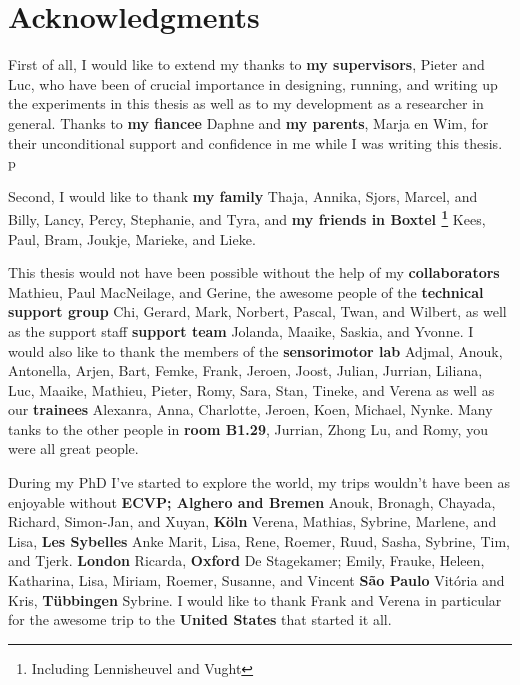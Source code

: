 \clearpage
\pagestyle{empty}

\chapter*{Acknowledgments}
{}

First of all, I would like to extend my thanks to \textbf{my supervisors}, Pieter and Luc, who have been of crucial importance in designing, running, and writing up the experiments in this thesis as well as to my development as a researcher in general. Thanks to \textbf{my fiancee} Daphne and \textbf{my parents}, Marja en Wim, for their unconditional support and confidence in me while I was writing this thesis. p

Second, I would like to thank \textbf{my family} Thaja, Annika, Sjors, Marcel, and Billy, Lancy, Percy, Stephanie, and Tyra, and \textbf{my friends in Boxtel \footnote{Including Lennisheuvel and Vught}} Kees, Paul, Bram, Joukje, Marieke, and Lieke.


This thesis would not have been possible without the help of 
my \textbf{collaborators} Mathieu, Paul MacNeilage, and Gerine,
the awesome people of the
\textbf{technical support group} Chi, Gerard, Mark, Norbert, Pascal, Twan, and Wilbert,
as well as the support staff
\textbf{support team} Jolanda, Maaike, Saskia, and Yvonne.
I would also like to thank the members of the 
\textbf{sensorimotor lab} Adjmal, Anouk, Antonella, Arjen, Bart, Femke, Frank, Jeroen, Joost, Julian, Jurrian, Liliana, Luc, Maaike, Mathieu, Pieter, Romy, Sara, Stan, Tineke, and Verena 
as well as our 
\textbf{trainees} Alexanra, Anna, Charlotte, Jeroen, Koen, Michael, Nynke.
Many tanks to the other people in \textbf{room B1.29}, Jurrian, Zhong Lu, and Romy, you were all great people.


During my PhD I've started to explore the world, my trips wouldn't have been as enjoyable without 
\textbf{ECVP; Alghero and Bremen} Anouk, Bronagh, Chayada, Richard, Simon-Jan, and Xuyan,
\textbf{K\"oln} Verena, Mathias, Sybrine, Marlene, and Lisa,
\textbf{Les Sybelles} Anke Marit, Lisa, Rene, Roemer, Ruud, Sasha, Sybrine, Tim, and Tjerk.
\textbf{London} Ricarda,
\textbf{Oxford} De Stagekamer; Emily, Frauke, Heleen, Katharina, Lisa, Miriam, Roemer, Susanne, and Vincent
\textbf{S\~ao Paulo} Vit\'oria and Kris,
\textbf{T\"ubbingen} Sybrine.
I would like to thank Frank and Verena in particular for the awesome trip to the \textbf{United States} that started it all.


